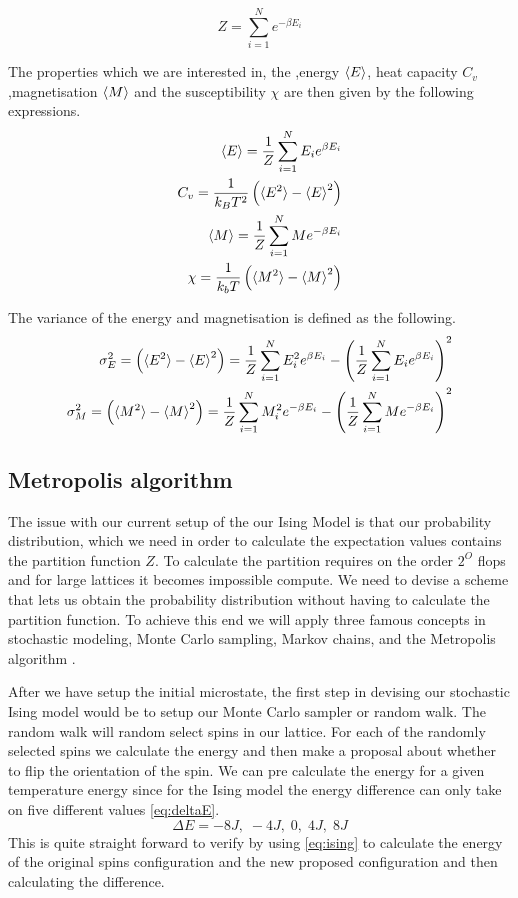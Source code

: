 \begin{equation}\label{eq:partFunc}
  Z = \sum_{i=1}^{N} e^{-\beta E_i}
\end{equation}

The properties which we are interested in, the ,energy $\braket{E}$, heat
capacity $C_v$,magnetisation $\braket{M}$ and the susceptibility $\chi$ are then given
by the following expressions.
\begin{eqnarray}
  \braket{E} = \frac{1}{Z} \sum_{i=1}^N E_i e^{\beta E_i} \\
  C_v = \frac{1}{k_B T^2}\left(\braket{E^2} - \braket{E}^2 \right) \\
  \braket{M} = \frac{1}{Z} \sum_{i=1}^{N} M e^{-\beta E_i} \\
  \chi = \frac{1}{k_b T}\left(\braket{M^2}- \braket{M}^2\right)
\end{eqnarray}

The variance of the energy and magnetisation is defined as the following.
\begin{eqnarray}
  \sigma_E^{2} = \left(\braket{E^2} - \braket{E}^2 \right) = \frac{1}{Z}
  \sum_{i=1}^N E_i^2 e^{\beta E_i} - \left(\frac{1}{Z} \sum_{i=1}^N E_i e^{\beta
  E_i}\right)^2  \\
  \sigma_M^{2} = \left(\braket{M^2}- \braket{M}^2\right) = \frac{1}{Z} \sum_{i=1}^{N} M_i^2 e^{-\beta E_i}  - \left(\frac{1}{Z} \sum_{i=1}^{N} M e^{-\beta E_i}  \right)^2
\end{eqnarray}


\subsection{Metropolis algorithm}
The issue with our current setup of the our Ising Model is that our probability
distribution, which we need in order to calculate the expectation values
contains the partition function $Z$. To calculate the partition requires on the
order $2^{O}$ flops and
for large lattices it becomes impossible compute. We need to devise a scheme
that lets us obtain the probability distribution without having to calculate the
partition function. To achieve this end we will apply three famous concepts in
stochastic modeling, Monte Carlo sampling, Markov chains, and the Metropolis
algorithm .

After we have setup the initial microstate, the first step in devising our stochastic Ising model would be to setup our
Monte Carlo sampler or random walk. The random walk will random select spins in
our lattice. For each of the randomly selected spins we calculate the energy and
then make a proposal about whether to flip the orientation of the spin. We can
pre calculate the energy for a given temperature energy since for the Ising
model the energy difference can only take on five different values \cref{eq:deltaE}.
\begin{equation}\label{eq:deltaE}
  \Delta E = -8J, \; -4J, \; 0, \; 4J, \; 8J
\end{equation}
This is quite straight forward to verify by using \cref{eq:ising} to calculate
the energy of the original spins configuration and the new proposed
configuration and then calculating the difference.

